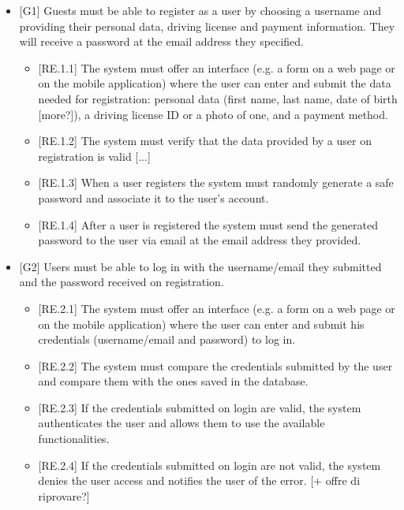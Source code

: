 \documentclass[english]{article}
\begin{document}
\begin{itemize}

\item{[G1] Guests must be able to register as a user by choosing a username and providing their personal data, driving license and payment information. They will receive a password at the email address they specified.
	
\begin{itemize}
\item{[RE.1.1] The system must offer an interface (e.g. a form on a web page or on the mobile application) where the user can enter and submit the data needed for registration: personal data (first name, last name, date of birth [more?]), a driving license ID or a photo of one, and a payment method.}
\item{[RE.1.2] The system must verify that the data provided by a user on registration is valid [...]}
\item{[RE.1.3] When a user registers the system must randomly generate a safe password and associate it to the user’s account.}
\item{[RE.1.4] After a user is registered the system must send the generated password to the user via email at the email address they provided.}
\end{itemize}
}

\item{[G2] Users must be able to log in with the username/email they submitted and the password received on registration.
\begin{itemize}
	\item{[RE.2.1] The system must offer an interface (e.g. a form on a web page or on the mobile application) where the user can enter and submit his credentials (username/email and password) to log in.}
	\item{[RE.2.2] The system must compare the credentials submitted by the user and compare them with the ones saved in the database.}
	\item{[RE.2.3] If the credentials submitted on login are valid, the system authenticates the user and allows them to use the available functionalities.}
	\item{[RE.2.4] If the credentials submitted on login are not valid, the system denies the user access and notifies the user of the error.}
[+ offre di riprovare?]
\end{itemize}
}


\end{itemize}
\end{document}
